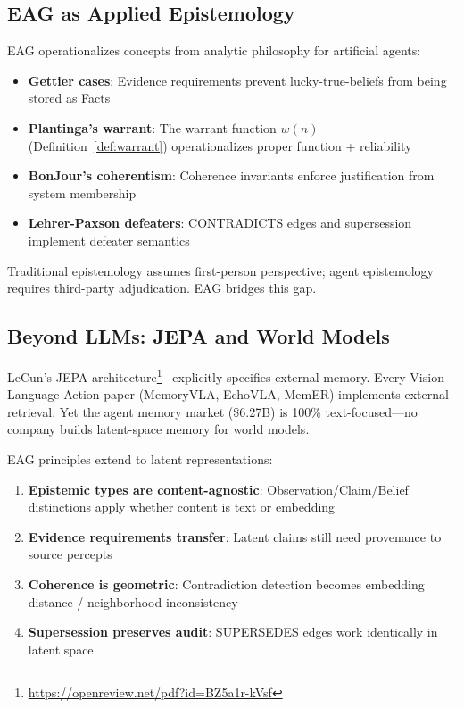 \documentclass[11pt,letterpaper]{article}
\begin{document}
\subsection{EAG as Applied Epistemology}

EAG operationalizes concepts from analytic philosophy for artificial agents:

\begin{itemize}[noitemsep]
    \item \textbf{Gettier cases}: Evidence requirements prevent lucky-true-beliefs from being stored as Facts
    \item \textbf{Plantinga's warrant}: The warrant function $w(n)$ (Definition~\ref{def:warrant}) operationalizes proper function + reliability
    \item \textbf{BonJour's coherentism}: Coherence invariants enforce justification from system membership
    \item \textbf{Lehrer-Paxson defeaters}: CONTRADICTS edges and supersession implement defeater semantics
\end{itemize}

Traditional epistemology assumes first-person perspective; agent epistemology requires third-party adjudication. EAG bridges this gap.

\subsection{Beyond LLMs: JEPA and World Models}

LeCun's JEPA architecture\footnote{\url{https://openreview.net/pdf?id=BZ5a1r-kVsf}}~\cite{lecun2022path} explicitly specifies external memory. Every Vision-Language-Action paper (MemoryVLA, EchoVLA, MemER) implements external retrieval. Yet the agent memory market (\$6.27B) is 100\% text-focused---no company builds latent-space memory for world models.

EAG principles extend to latent representations:
\begin{enumerate}[noitemsep]
    \item \textbf{Epistemic types are content-agnostic}: Observation/Claim/Belief distinctions apply whether content is text or embedding
    \item \textbf{Evidence requirements transfer}: Latent claims still need provenance to source percepts
    \item \textbf{Coherence is geometric}: Contradiction detection becomes embedding distance / neighborhood inconsistency
    \item \textbf{Supersession preserves audit}: SUPERSEDES edges work identically in latent space
\end{enumerate}
\end{document}

